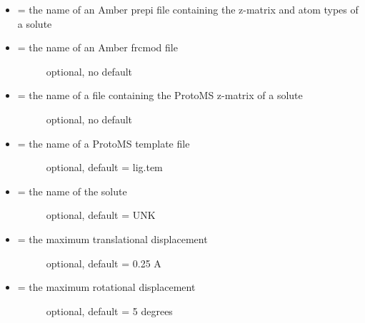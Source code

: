 \documentclass[letterpaper,10pt,english]{manual}
\begin{document}
\begin{itemize}
\item {} 
 = the name of an Amber prepi file containing the z-matrix and atom types of a solute

\item {} \begin{description}
\item[{ = the name of an Amber frcmod file}] \leavevmode
optional, no default

\end{description}

\item {} \begin{description}
\item[{ = the name of a file containing the ProtoMS z-matrix of a solute}] \leavevmode
optional, no default

\end{description}

\item {} \begin{description}
\item[{ = the name of a ProtoMS template file}] \leavevmode
optional, default = lig.tem

\end{description}

\item {} \begin{description}
\item[{ = the name of the solute}] \leavevmode
optional, default = UNK

\end{description}

\item {} \begin{description}
\item[{ = the maximum translational displacement}] \leavevmode
optional, default = 0.25 A

\end{description}

\item {} \begin{description}
\item[{ = the maximum rotational displacement}] \leavevmode
optional, default = 5 degrees

\end{description}

\end{itemize}
\end{document}
